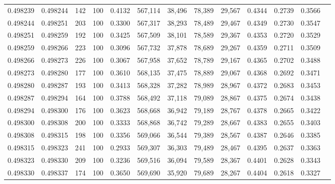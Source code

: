 \begin{tabular}{rrrrrrrrrrrrr}
0.498239 & 0.498244 &   142 & 100 &                                     0.4132 & 567,114 &  38,496 &  78,389 &  29,567 & 0.4344 & 0.2739 & 0.3566 \\
0.498244 & 0.498251 &   203 & 100 &                                     0.3300 & 567,317 &  38,293 &  78,489 &  29,467 & 0.4349 & 0.2730 & 0.3547 \\
0.498251 & 0.498259 &   192 & 100 &                                     0.3425 & 567,509 &  38,101 &  78,589 &  29,367 & 0.4353 & 0.2720 & 0.3529 \\
0.498259 & 0.498266 &   223 & 100 &                                     0.3096 & 567,732 &  37,878 &  78,689 &  29,267 & 0.4359 & 0.2711 & 0.3509 \\
0.498266 & 0.498273 &   226 & 100 &                                     0.3067 & 567,958 &  37,652 &  78,789 &  29,167 & 0.4365 & 0.2702 & 0.3488 \\
0.498273 & 0.498280 &   177 & 100 &                                     0.3610 & 568,135 &  37,475 &  78,889 &  29,067 & 0.4368 & 0.2692 & 0.3471 \\
0.498280 & 0.498287 &   193 & 100 &                                     0.3413 & 568,328 &  37,282 &  78,989 &  28,967 & 0.4372 & 0.2683 & 0.3453 \\
0.498287 & 0.498294 &   164 & 100 &                                     0.3788 & 568,492 &  37,118 &  79,089 &  28,867 & 0.4375 & 0.2674 & 0.3438 \\
0.498294 & 0.498300 &   176 & 100 &                                     0.3623 & 568,668 &  36,942 &  79,189 &  28,767 & 0.4378 & 0.2665 & 0.3422 \\
0.498300 & 0.498308 &   200 & 100 &                                     0.3333 & 568,868 &  36,742 &  79,289 &  28,667 & 0.4383 & 0.2655 & 0.3403 \\
0.498308 & 0.498315 &   198 & 100 &                                     0.3356 & 569,066 &  36,544 &  79,389 &  28,567 & 0.4387 & 0.2646 & 0.3385 \\
0.498315 & 0.498323 &   241 & 100 &                                     0.2933 & 569,307 &  36,303 &  79,489 &  28,467 & 0.4395 & 0.2637 & 0.3363 \\
0.498323 & 0.498330 &   209 & 100 &                                     0.3236 & 569,516 &  36,094 &  79,589 &  28,367 & 0.4401 & 0.2628 & 0.3343 \\
0.498330 & 0.498337 &   174 & 100 &                                     0.3650 & 569,690 &  35,920 &  79,689 &  28,267 & 0.4404 & 0.2618 & 0.3327 \\

\end{tabular}
